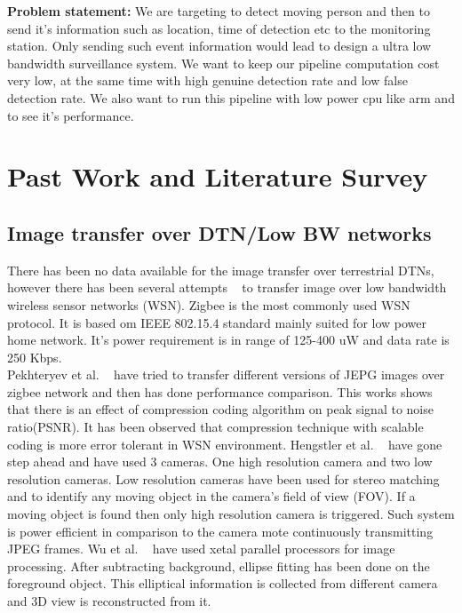 \textbf{Problem statement:} We are targeting to detect moving person and
then to send it's information such as location, time of detection etc to
the monitoring station. Only sending such event information would lead
to design a ultra low bandwidth surveillance system. We want to keep our
pipeline computation cost very low, at the same time with high genuine
detection rate and low false detection rate. We also want to run this
pipeline with low power cpu like arm and to see it's performance.\\

\pagebreak


\section{Past Work and Literature Survey}

\subsection{Image transfer over DTN/Low BW networks}

\indent There has been no data available for the image transfer over
terrestrial DTNs, however there has been several attempts ~\cite{2, 3,
4, 5} to transfer image over low bandwidth wireless sensor networks
(WSN). Zigbee is the most commonly used WSN protocol. It is based om IEEE
802.15.4 standard mainly suited for low power home network. It's power
requirement is in range of 125-400 uW and data rate is 250 Kbps.\\

\indent Pekhteryev et al. ~\cite{2} have tried to transfer different
versions of JEPG images over zigbee network and then has done
performance comparison.  This works shows that there is an effect of
compression coding algorithm on peak signal to noise ratio(PSNR). It has
been observed that compression technique with scalable coding is more
error tolerant in WSN environment. Hengstler et al. ~\cite{3, 5} have
gone step ahead and have used 3 cameras. One high resolution camera and
two low resolution cameras. Low resolution cameras have been used for
stereo matching and to identify any moving object in the camera's field
of view (FOV). If a moving object is found then only high resolution
camera is triggered. Such system is power efficient in  comparison to
the camera mote continuously transmitting JPEG frames. Wu et al.
~\cite{4} have used xetal parallel processors for image processing.
After subtracting background, ellipse fitting has been done on the
foreground object. This elliptical information is collected from
different camera and 3D view is reconstructed from it.\\

